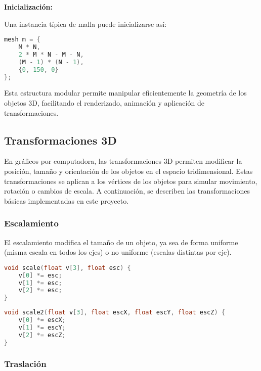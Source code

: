 \documentclass[12pt]{article}
\begin{document}
    \textbf{Inicialización:}

    Una instancia típica de malla puede inicializarse así:

    \begin{lstlisting}[language=C, caption={Inicialización de una malla}]
mesh m = {
    M * N,
    2 * M * N - M - N,
    (M - 1) * (N - 1),
    {0, 150, 0}
};
    \end{lstlisting}

    Esta estructura modular permite manipular eficientemente la geometría de los objetos 3D, facilitando el renderizado, animación y aplicación de transformaciones.


    \subsection{Transformaciones 3D}

    En gráficos por computadora, las transformaciones 3D permiten modificar la posición, tamaño y orientación de los objetos en el espacio tridimensional. Estas transformaciones se aplican a los vértices de los objetos para simular movimiento, rotación o cambios de escala. A continuación, se describen las transformaciones básicas implementadas en este proyecto.

    \subsubsection{Escalamiento}

    El escalamiento modifica el tamaño de un objeto, ya sea de forma uniforme (misma escala en todos los ejes) o no uniforme (escalas distintas por eje).

    \begin{lstlisting}[language=C, caption={Escalamiento uniforme}]
void scale(float v[3], float esc) {
    v[0] *= esc;
    v[1] *= esc;
    v[2] *= esc;
}
    \end{lstlisting}

    \begin{lstlisting}[language=C, caption={Escalamiento no uniforme}]
void scale2(float v[3], float escX, float escY, float escZ) {
    v[0] *= escX;
    v[1] *= escY;
    v[2] *= escZ;
}
    \end{lstlisting}

    \subsubsection{Traslación}
\end{document}
